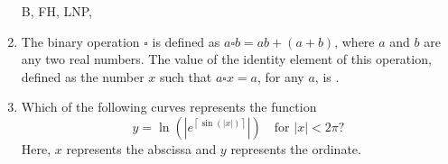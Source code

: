 \documentclass[journal]{IEEEtran}
\begin{document}
\begin{enumerate}[leftmargin=0pt]
\medskip

\hspace{1em} B, FH, LNP, \underline{\hspace{1.5cm}}

\begin{enumerate}
\end{enumerate}

\hfill{}


\item The binary operation $\square$ is defined as $a \square b = ab + (a + b)$, where $a$ and $b$ are any two real numbers. The value of the identity element of this operation, defined as the number $x$ such that $a \square x = a$, for any $a$, is \underline{\hspace{1cm}}.

\begin{enumerate}
\end{enumerate}

\hfill{}



\item Which of the following curves represents the function 
\[
y = \ln\left( \left| e^{\left\lceil \sin(|x|) \right\rceil} \right| \right) \quad \text{for } |x| < 2\pi?
\]
Here, $x$ represents the abscissa and $y$ represents the ordinate.


\end{enumerate}
\end{document}
